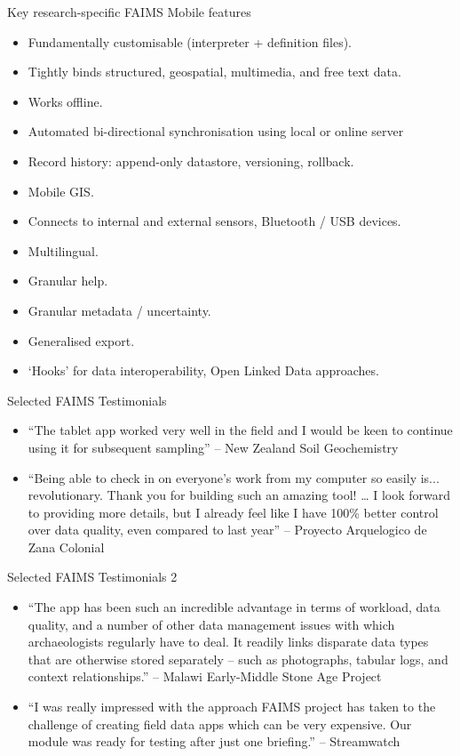 \documentclass[aspectratio=169, 12pt]{beamer} %
\begin{document}
\begin{frame}{Key research-specific FAIMS Mobile features}
    \begin{itemize}[label=\textbullet]
        \item Fundamentally customisable (interpreter + definition files).
        \item Tightly binds structured, geospatial, multimedia, and free text data.
        \item Works offline.
        \item Automated bi-directional synchronisation using local or online server
        \item Record history: append-only datastore, versioning, rollback.
        \item Mobile GIS.
        \item Connects to internal and external sensors, Bluetooth / USB devices.
        \item Multilingual.
        \item Granular help.
        \item Granular metadata / uncertainty.
        \item Generalised export.
        \item `Hooks’ for data interoperability, Open Linked Data approaches.
    \end{itemize}
\end{frame}
\begin{frame}{Selected FAIMS Testimonials}
    \begin{itemize}[label=\textbullet]
    \item ``The tablet app worked very well in the field and I would be keen to continue using it for subsequent sampling'' -- New Zealand Soil Geochemistry
    \item ``Being able to check in on everyone's work from my computer so easily is... revolutionary. Thank you for building such an amazing tool! …  I look forward to providing more details, but I already feel like I have 100\%{} better control over data quality, even compared to last year'' -- Proyecto Arquelogico de Zana Colonial
    \end{itemize}
\end{frame}
\begin{frame}{Selected FAIMS Testimonials 2}
    \begin{itemize}[label=\textbullet]
    \item ``The app has been such an incredible advantage in terms of workload, data quality, and a number of other data management issues with which archaeologists regularly have to deal. It readily links disparate data types that are otherwise stored separately – such as photographs, tabular logs, and context relationships.'' -- Malawi Early-Middle Stone Age Project
    \item ``I was really impressed with the approach FAIMS project has taken to the challenge of creating field data apps which can be very expensive. Our module was ready for testing after just one briefing.'' -- Streamwatch
    \end{itemize}
\end{frame}
\end{document}
